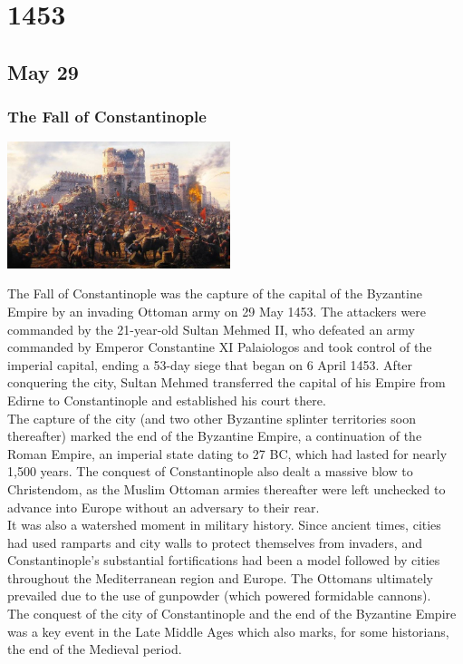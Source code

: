 \documentclass[11pt]{report}
\begin{document}
\chapter{1453}
\section{May 29}
\subsection{The Fall of Constantinople}
\vspace{2mm}\begin{center}\includegraphics[width=6.5cm]{./img/fallofConstantpl.jpg}\end{center}
The Fall of Constantinople was the capture of the capital of the Byzantine Empire by an invading Ottoman army on 29 May 1453. The attackers were commanded by the 21-year-old Sultan Mehmed II, who defeated an army commanded by Emperor Constantine XI Palaiologos and took control of the imperial capital, ending a 53-day siege that began on 6 April 1453. After conquering the city, Sultan Mehmed transferred the capital of his Empire from Edirne to Constantinople and established his court there.\\
The capture of the city (and two other Byzantine splinter territories soon thereafter) marked the end of the Byzantine Empire, a continuation of the Roman Empire, an imperial state dating to 27 BC, which had lasted for nearly 1,500 years. The conquest of Constantinople also dealt a massive blow to Christendom, as the Muslim Ottoman armies thereafter were left unchecked to advance into Europe without an adversary to their rear.\\
It was also a watershed moment in military history. Since ancient times, cities had used ramparts and city walls to protect themselves from invaders, and Constantinople's substantial fortifications had been a model followed by cities throughout the Mediterranean region and Europe. The Ottomans ultimately prevailed due to the use of gunpowder (which powered formidable cannons).\\
The conquest of the city of Constantinople and the end of the Byzantine Empire was a key event in the Late Middle Ages which also marks, for some historians, the end of the Medieval period.
\end{document}
